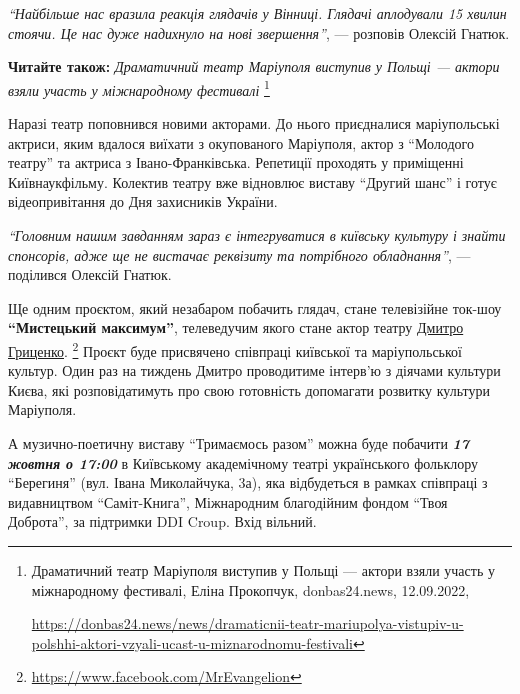 \begin{leftbar}
\emph{\enquote{Найбільше нас вразила реакція глядачів у Вінниці. Глядачі аплодували 15 хвилин
стоячи. Це нас дуже надихнуло на нові звершення}}, — розповів Олексій Гнатюк. 
\end{leftbar}

\textbf{Читайте також:} \emph{Драматичний театр Маріуполя виступив у Польщі — актори взяли участь у міжнародному фестивалі}%
\footnote{Драматичний театр Маріуполя виступив у Польщі — актори взяли участь у міжнародному фестивалі, %
Еліна Прокопчук, donbas24.news, 12.09.2022, \par%
\url{https://donbas24.news/news/dramaticnii-teatr-mariupolya-vistupiv-u-polshhi-aktori-vzyali-ucast-u-miznarodnomu-festivali}%
}


Наразі театр поповнився новими акторами. До нього приєдналися маріупольські
актриси, яким вдалося виїхати з окупованого Маріуполя, актор з \enquote{Молодого
театру} та актриса з Івано-Франківська. Репетиції проходять у приміщенні
Київнаукфільму. Колектив театру вже відновлює виставу \enquote{Другий шанс} і готує
відеопривітання до Дня захисників України.

\begin{leftbar}
\emph{\enquote{Головним нашим завданням зараз є інтегруватися в київську культуру і знайти
спонсорів, адже ще не вистачає реквізиту та потрібного обладнання}}, — поділився
Олексій Гнатюк.
\end{leftbar}


Ще одним проєктом, який незабаром побачить глядач, стане телевізійне ток-шоу
\textbf{\enquote{Мистецький максимум}}, телеведучим якого стане актор театру \href{https://www.facebook.com/MrEvangelion}{%
Дмитро Гриценко}.%
\footnote{\url{https://www.facebook.com/MrEvangelion}} %
Проєкт буде присвячено співпраці київської та маріупольської культур. Один раз
на тиждень Дмитро проводитиме інтерв'ю з діячами культури Києва, які
розповідатимуть про свою готовність допомагати розвитку культури Маріуполя.

А музично-поетичну виставу \enquote{Тримаємось разом} можна буде побачити \textbf{\emph{17 жовтня о
17:00}} в Київському академічному театрі українського фольклору \enquote{Берегиня} (вул.
Івана Миколайчука, 3а), яка відбудеться в рамках співпраці з видавництвом
\enquote{Саміт-Книга}, Міжнародним благодійним фондом \enquote{Твоя Доброта}, за підтримки DDI
Croup. Вхід вільний.

